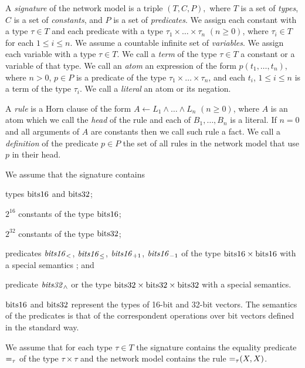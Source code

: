 A \emph{signature} of the network model is a triple $(T, C, P),$ where $T$ is a set of \emph{types}, $C$ is a set of \emph{constants}, and $P$ is a set of \emph{predicates}. We assign each constant with a type $\tau\in T$ and each predicate with a type $\tau_1\times\ldots\times\tau_n$ $(n\ge0)$, where $\tau_i\in T$ for each $1\leq i \leq n$. We assume a countable infinite set of \emph{variables}. We assign each variable with a type $\tau\in T$. We call a \emph{term} of the type $\tau\in T$ a constant or a variable of that type. We call an \emph{atom} an expression of the form $p(t_1,\ldots,t_n)$, where $n>0$, $p\in P$ is a predicate of the type $\tau_1\times\ldots\times\tau_n$, and each $t_i$, $1\leq i \leq n$ is a term of the type $\tau_i$. We call a \emph{literal} an atom or its negation.

A \emph{rule} is a Horn clause of the form $A\leftarrow L_1 \wedge \ldots \wedge L_n$ $(n \ge 0)$, where $A$ is an atom which we call the \emph{head} of the rule and each of $B_1,\ldots,B_n$ is a literal. If $n=0$ and all arguments of $A$ are constants then we call such rule a fact. We call a \emph{definition} of the predicate $p \in P$ the set of all rules in the network model that use $p$ in their head.

We assume that the signature contains
\begin{enumerate*}[label=(\roman*)]
  \item types $\mathrm{bits16}$ and $\mathrm{bits32}$;
  \item $2^{16}$ constants of the type $\mathrm{bits16}$;
  \item $2^{32}$ constants of the type $\mathrm{bits32}$;
  \item predicates $\mathit{bits16}_<$, $\mathit{bits16}_\le$, $\mathit{bits16}_{+1}$, $\mathit{bits16}_{-1}$ of the type $\mathrm{bits16} \times \mathrm{bits16}$ with a special semantics ; and
  \item predicate $\mathit{bits32}_\wedge$ or the type $\mathrm{bits32}\times\mathrm{bits32}\times\mathrm{bits32}$ with a special semantics.
\end{enumerate*}
$\mathrm{bits16}$ and $\mathrm{bits32}$ represent the types of 16-bit and 32-bit vectors. The semantics of the predicates is that of the correspondent operations over bit vectors defined in the standard way.

We assume that for each type $\tau\in T$ the signature contains the equality predicate $\mathit{=}_\tau$ of the type $\tau\times\tau$ and the network model contains the rule $\mathit{=}_\tau(X,X)$.

